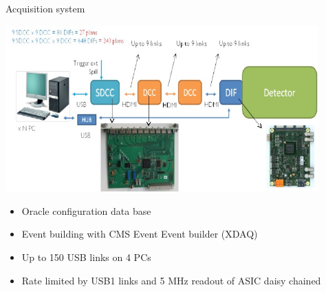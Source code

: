 \documentclass[10pt]{beamer}
\begin{document}
\begin{frame}{Acquisition system}
  \centerline{\includegraphics[width=0.9\textwidth,height=0.45\textheight]{jpg/DAQLinks}}
  \begin{block}{}
    \begin{itemize}

     \item Oracle configuration data base
     \item  Event building with CMS Event Event builder (XDAQ)
     \item  Up to 150 USB links on 4 PCs
     \item  Rate limited by USB1 links and  5 MHz readout of ASIC daisy chained 

    \end{itemize}
  \end{block}
\end{frame}
\end{document}
